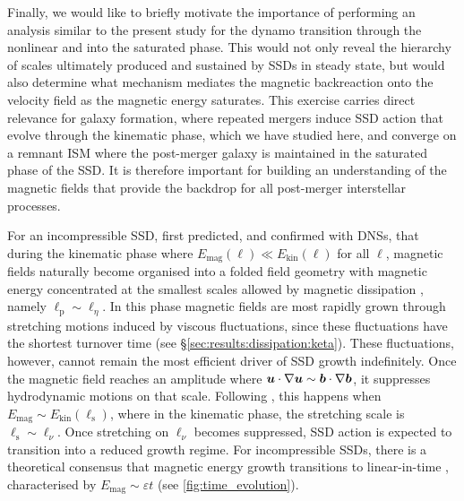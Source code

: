Finally, we would like to briefly motivate the importance of performing an analysis similar to the present study for the dynamo transition through the nonlinear and into the saturated phase. This would not only reveal the hierarchy of scales ultimately produced and sustained by SSDs in steady state, but would also determine what mechanism mediates the magnetic backreaction onto the velocity field as the magnetic energy saturates. This exercise carries direct relevance for galaxy formation, where repeated mergers induce SSD action that evolve through the kinematic phase, which we have studied here, and converge on a remnant ISM where the post-merger galaxy is maintained in the saturated phase of the SSD. It is therefore important for building an understanding of the magnetic fields that provide the backdrop for all post-merger interstellar processes.

For an incompressible SSD, \citet{schekochihin2001structure, schekochihin2002small, schekochihin2004simulations} first predicted, and  confirmed with DNSs, that during the kinematic phase where $E_\mathrm{mag}(\ell) \ll E_\mathrm{kin}(\ell)$ for all $\ell$, magnetic fields naturally become organised into a folded field geometry with magnetic energy concentrated at the smallest scales allowed by magnetic dissipation \citep[see also \eg][]{brandenburg2023dissipative}, namely $\ell_\mathrm{p} \sim \ell_\eta$. In this phase magnetic fields are most rapidly grown through stretching motions \citep{cho2009growth, beattie2023bulk} induced by viscous fluctuations, since these fluctuations have the shortest turnover time (see \S\ref{sec:results:dissipation:keta}). These fluctuations, however, cannot remain the most efficient driver of SSD growth indefinitely. Once the magnetic field reaches an amplitude where $\bm{u}\cdot\nabla\bm{u} \sim \bm{b}\cdot\nabla\bm{b}$, it suppresses hydrodynamic motions on that scale. Following \citet{schekochihin2002model}, this happens when $E_\mathrm{mag} \sim E_\mathrm{kin}(\ell_\mathrm{s})$, where in the kinematic phase, the stretching scale is $\ell_\mathrm{s} \sim \ell_\nu$. Once stretching on $\ell_\nu$ becomes suppressed, SSD action is expected to transition into a reduced growth regime. For incompressible SSDs, there is a theoretical consensus that magnetic energy growth transitions to linear-in-time \citep{cho2009growth, beresnyak2012universal, Xu2016_dynamo, seta2020saturation}, characterised by $E_\mathrm{mag} \sim \varepsilon t$ (see \autoref{fig:time_evolution}).

